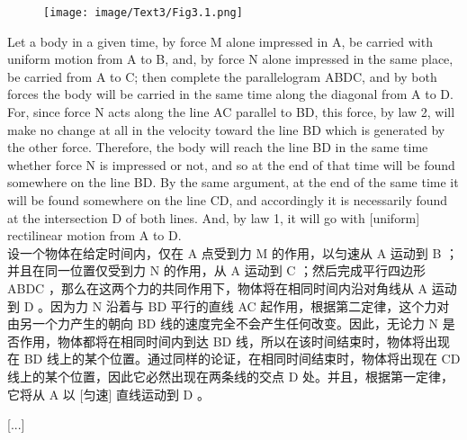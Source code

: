 \documentclass{article}
\begin{document}
\addtolength{\leftskip}{-1cm}
\addtolength{\rightskip}{-1cm}
\begin{figure}
    \centering
    \texttt{[image: image/Text3/Fig3.1.png]}
\end{figure}
\noindent Let a body in a given time, by force M alone impressed in A, be carried with uniform motion from A to B, and, by force N alone impressed in the same place, be carried from A to C; then complete the parallelogram ABDC, and by both forces the body will be carried in the same time along the diagonal from A to D. For, since force N acts along the line AC parallel to BD, this force, by law 2, will make no change at all in the velocity toward the line BD which is generated by the other force. Therefore, the body will reach the line BD in the same time whether force N is impressed or not, and so at the end of that time will be found somewhere on the line BD. By the same argument, at the end of the same time it will be found somewhere on the line CD, and accordingly it is necessarily found at the intersection D of both lines. And, by law 1, it will go with [uniform] rectilinear motion from A to D.\\
设一个物体在给定时间内，仅在 A 点受到力 M 的作用，以匀速从 A 运动到 B ；并且在同一位置仅受到力 N 的作用，从 A 运动到 C ；然后完成平行四边形 ABDC ，那么在这两个力的共同作用下，物体将在相同时间内沿对角线从 A 运动到 D 。因为力 N 沿着与 BD 平行的直线 AC 起作用，根据第二定律，这个力对由另一个力产生的朝向 BD 线的速度完全不会产生任何改变。因此，无论力 N 是否作用，物体都将在相同时间内到达 BD 线，所以在该时间结束时，物体将出现在 BD 线上的某个位置。通过同样的论证，在相同时间结束时，物体将出现在 CD 线上的某个位置，因此它必然出现在两条线的交点 D 处。并且，根据第一定律，它将从 A 以 [匀速] 直线运动到 D 。\\

\begin{center}
    [...]
\end{center}
\end{document}

